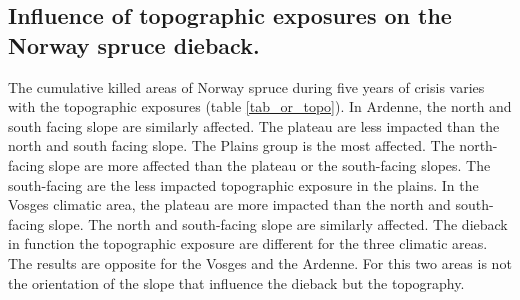 \documentclass[3p,procedia]{elsarticle}
\begin{document}


	


\subsection{Influence of topographic exposures on the Norway spruce dieback.}

The cumulative killed areas of Norway spruce during five years of crisis varies with the topographic exposures (table \ref{tab_or_topo}).
In Ardenne, the north and south facing slope are similarly affected. 
The plateau are less impacted than the north and south facing slope.
The Plains group is the most affected. 
The north-facing slope are more affected than the plateau or the south-facing slopes.
The south-facing are the less impacted topographic exposure in the plains.
In the Vosges climatic area, the plateau are more impacted than the north and south-facing slope.
The north and south-facing slope are similarly affected.
The dieback in function the topographic exposure are different for the three climatic areas.
The results are opposite for the Vosges and the Ardenne.
For this two areas is not the orientation of the slope that influence the dieback but the topography.
\end{document}
